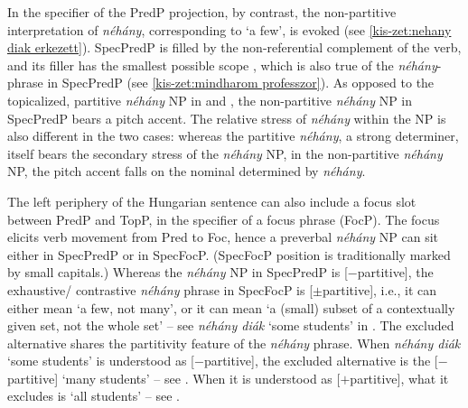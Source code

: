 \documentclass[output=paper]{langscibook}
\begin{document}
In the specifier of the PredP projection, by contrast, the non-partitive interpretation of \textit{néhány}, corresponding to `a few', is evoked (see \ref{kis-zet:nehany diak erkezett}).  SpecPredP is filled by the non-referential complement of the verb, and its filler has the smallest possible scope \citep{szabolcsi1983specifikus}, which is also true of the \textit{néhány}-phrase in SpecPredP (see \ref{kis-zet:mindharom professzor}). As opposed to the topicalized, partitive \textit{néhány} NP in  and , the non-partitive \textit{néhány} NP in SpecPredP bears a pitch accent. The relative stress of \textit{néhány} within the NP is also different in the two cases: whereas the partitive \textit{néhány}, a strong determiner, itself bears the secondary stress of the \textit{néhány} NP, in the non-partitive \textit{néhány} NP, the pitch accent falls on the nominal determined by \textit{néhány}.

\eal
{}
\ex[]{
\gll [[$_\text{DistP}$ \minsp{ʹ} Mind-három professzor	[$_\text{PredP}$ néhány \minsp{ʹ} diákkal konzultál.]]\\
{} {} all-three professor	{} some {} student.with consults\\
\glt `Each of the three professors is consulting with some students.' \label{kis-zet:mindharom professzor}
}
\zl

\noindent The left periphery of the Hungarian sentence can also include a focus slot between PredP and TopP, in the specifier of a focus phrase (FocP). The focus elicits verb movement from Pred to Foc, hence a preverbal \textit{néhány} NP can sit either in SpecPredP or in SpecFocP. (SpecFocP position is traditionally marked by small capitals.) Whereas the \textit{néhány} NP in SpecPredP is [$-$partitive], the exhaustive/ contrastive \textit{néhány} phrase in SpecFocP is [$\pm$parti\-tive], i.e., it can either mean `a few, not many', or it can mean ‘a (small) subset of a contextually given set, not the whole set’ -- see \textit{néhány diák} `some students' in . The excluded alternative shares the partitivity feature of the \textit{néhány} phrase. When \textit{néhány diák} `some students' is understood as [$-$partitive], the excluded alternative is the [$-$partitive] `many students' – see . When it is understood as [$+$partitive], what it excludes is `all students' -- see . 
\end{document}
